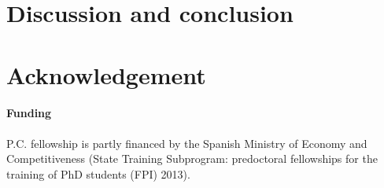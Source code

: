 \documentclass{bioinfo}
\begin{document}

\section{Discussion and conclusion}

\section*{Acknowledgement}

\paragraph{Funding\textcolon}
P.C. fellowship is partly financed by the Spanish Ministry of Economy and
Competitiveness (State Training Subprogram: predoctoral fellowships for the
training of PhD students (FPI) 2013).



\end{document}
